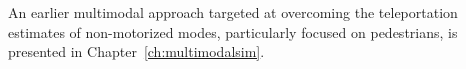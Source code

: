 An earlier \gls{multimodal} approach targeted at overcoming the \gls{teleportation} estimates of non-motorized modes, particularly focused on pedestrians, is presented in Chapter~\ref{ch:multimodalsim}.

 






